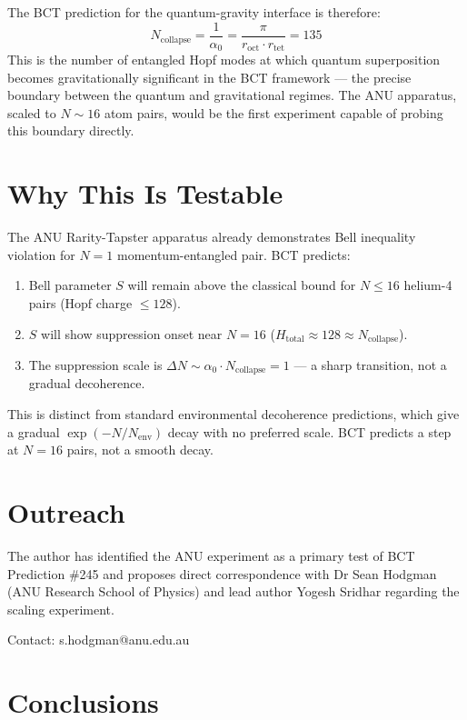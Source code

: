 \documentclass[aps,prl,twocolumn,showpacs,superscriptaddress]{revtex4-2}
\begin{document}
The BCT prediction for the quantum-gravity interface is therefore:
\begin{equation}
N_\mathrm{collapse} = \frac{1}{\alpha_0} = \frac{\pi}{r_\mathrm{oct}
\cdot r_\mathrm{tet}} = 135
\end{equation}
This is the number of entangled Hopf modes at which quantum
superposition becomes gravitationally significant in the BCT
framework --- the precise boundary between the quantum and
gravitational regimes. The ANU apparatus, scaled to $N \sim 16$
atom pairs, would be the first experiment capable of probing this
boundary directly.

\section{Why This Is Testable}

The ANU Rarity-Tapster apparatus already demonstrates Bell inequality
violation for $N = 1$ momentum-entangled pair. BCT predicts:

\begin{enumerate}
\item Bell parameter $S$ will remain above the classical bound for
$N \leq 16$ helium-4 pairs (Hopf charge $\leq 128$).
\item $S$ will show suppression onset near $N = 16$ ($H_\mathrm{total}
\approx 128 \approx N_\mathrm{collapse}$).
\item The suppression scale is $\Delta N \sim \alpha_0 \cdot
N_\mathrm{collapse} = 1$ --- a sharp transition, not a gradual
decoherence.
\end{enumerate}

This is distinct from standard environmental decoherence predictions,
which give a gradual $\exp(-N/N_\mathrm{env})$ decay with no
preferred scale. BCT predicts a step at $N = 16$ pairs,
not a smooth decay.

\section{Outreach}

The author has identified the ANU experiment as a primary test of
BCT Prediction \#245 and proposes direct correspondence with
Dr Sean Hodgman (ANU Research School of Physics) and lead author
Yogesh Sridhar regarding the scaling experiment.

Contact: s.hodgman@anu.edu.au

\section{Conclusions}
\end{document}
